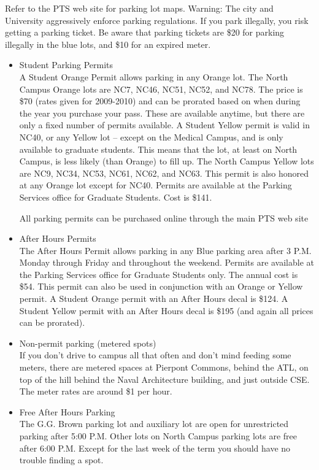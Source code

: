 \documentclass[11pt]{article}
\begin{document}
Refer to the PTS web site for parking lot maps.
Warning: The city and University aggressively enforce parking
regulations. If you park illegally, you risk getting a parking
ticket. Be aware that parking tickets are \$20 for parking illegally in
the blue lots, and \$10 for an expired meter.
\begin{itemize}

\item Student Parking Permits\\
\label{sec-11_4_1_1}%
A Student Orange Permit allows parking in any Orange lot. The North
Campus Orange lots are NC7, NC46, NC51, NC52, and NC78.  The price is
\$70 (rates given for 2009-2010) and can be prorated based on when
during the year you purchase your pass.  These are available anytime,
but there are only a fixed number of permits available.  A Student
Yellow permit is valid in NC40, or any Yellow lot – except on the
Medical Campus, and is only available to graduate students.  This
means that the lot, at least on North Campus, is less likely (than
Orange) to fill up. The North Campus Yellow lots are NC9, NC34, NC53,
NC61, NC62, and NC63.  This permit is also honored at any Orange lot
except for NC40.  Permits are available at the Parking Services office
for Graduate Students. Cost is \$141.

All parking permits can be purchased online through the main PTS web
site


\item After Hours Permits\\
\label{sec-11_4_1_2}%
The After Hours Permit allows parking in any Blue parking area after 3
P.M. Monday through Friday and throughout the weekend.  Permits are
available at the Parking Services office for Graduate Students only.
The annual cost is \$54.  This permit can also be used in conjunction
with an Orange or Yellow permit.  A Student Orange permit with an
After Hours decal is \$124.  A Student Yellow permit with an After
Hours decal is \$195 (and again all prices can be prorated).


\item Non-permit parking (metered spots)\\
\label{sec-11_4_1_3}%
If you don't drive to campus all that often and don't mind feeding
some meters, there are metered spaces at Pierpont Commons, behind the
ATL, on top of the hill behind the Naval Architecture building, and
just outside CSE.  The meter rates are around \$1 per hour.


\item Free After Hours Parking\\
\label{sec-11_4_1_4}%
The G.G. Brown parking lot and auxiliary lot are open for unrestricted
parking after 5:00 P.M.  Other lots on North Campus parking lots are
free after 6:00 P.M.  Except for the last week of the term you should
have no trouble finding a spot.



\end{itemize}
\end{document}
